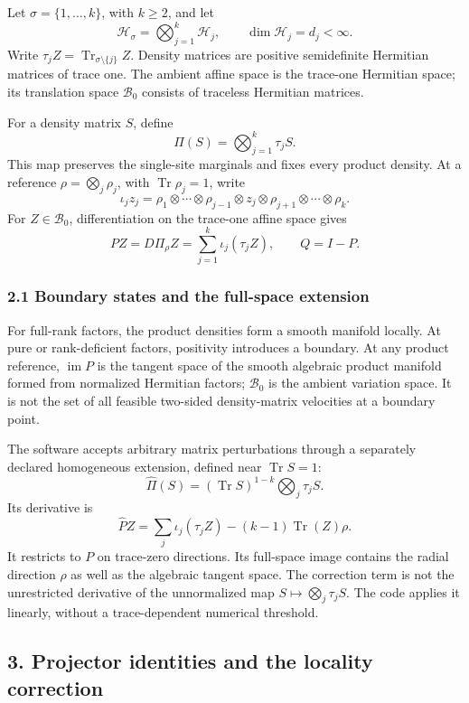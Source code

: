 \documentclass[
  11pt,
]{article}
\begin{document}
Let \(\sigma=\{1,\ldots,k\}\), with \(k\ge2\), and let
\[
\mathcal H_\sigma=\bigotimes_{j=1}^k\mathcal H_j,\qquad
\dim\mathcal H_j=d_j<\infty.
\]
Write \(\tau_j Z=\operatorname{Tr}_{\sigma\setminus\{j\}}Z\).
Density matrices are positive semidefinite Hermitian matrices of trace one.
The ambient affine space is the trace-one Hermitian space; its translation space
\(\mathcal B_0\) consists of traceless Hermitian matrices.

For a density matrix \(S\), define
\[
\Pi(S)=\bigotimes_{j=1}^k\tau_j S.
\]
This map preserves the single-site marginals and fixes every product density.
At a reference
\(\rho=\bigotimes_j\rho_j\), with \(\operatorname{Tr}\rho_j=1\), write
\[
\iota_j z_j=
\rho_1\otimes\cdots\otimes\rho_{j-1}\otimes z_j
\otimes\rho_{j+1}\otimes\cdots\otimes\rho_k.
\]
For \(Z\in\mathcal B_0\), differentiation on the trace-one affine space gives
\[
PZ=D\Pi_\rho Z=\sum_{j=1}^k\iota_j(\tau_j Z),\qquad Q=I-P.
\]

\subsubsection{2.1 Boundary states and the full-space extension}\label{boundary-states-and-the-full-space-extension}

For full-rank factors, the product densities form a smooth manifold locally.
At pure or rank-deficient factors, positivity introduces a boundary.
At any product reference, \(\operatorname{im}P\) is the tangent space of the smooth algebraic product manifold formed from normalized Hermitian factors; \(\mathcal B_0\) is the ambient variation space. It is not the set of all feasible two-sided density-matrix velocities at a boundary point.

The software accepts arbitrary matrix perturbations through a separately
declared homogeneous extension, defined near \(\operatorname{Tr}S=1\):
\[
\widehat\Pi(S)=(\operatorname{Tr}S)^{1-k}
              \bigotimes_j\tau_j S.
\]
Its derivative is
\[
\widehat PZ=\sum_j\iota_j(\tau_j Z)
            -(k-1)\operatorname{Tr}(Z)\rho.
\]
It restricts to \(P\) on trace-zero directions. Its full-space image contains
the radial direction \(\rho\) as well as the algebraic tangent space.
The correction term is not the unrestricted derivative of the unnormalized
map \(S\mapsto\bigotimes_j\tau_j S\). The code applies it linearly, without a
trace-dependent numerical threshold.

\subsection{3. Projector identities and the locality correction}\label{projector-identities-and-the-locality-correction}
\end{document}
